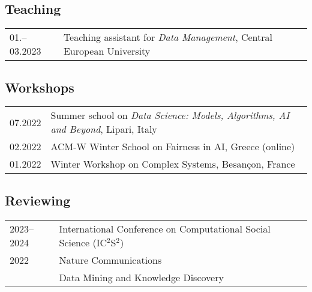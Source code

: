 \subsection*{Teaching}
\begin{longtable}[l]{@{}p{} p{}}
01.–03.2023 & Teaching assistant for \emph{Data Management}, Central European University\\
\end{longtable}


\subsection*{Workshops}
\begin{longtable}[l]{@{}p{} p{}}
    07.2022     & Summer school on \emph{Data Science: Models, Algorithms, AI and Beyond}, Lipari, Italy\\
    02.2022     & ACM-W Winter School on Fairness in AI, Greece (online)\\
    01.2022	    & Winter Workshop on Complex Systems, Besançon, France\\
\end{longtable}

\subsection*{Reviewing}
%
\begin{longtable}[l]{@{}p{} p{}}
    2023--2024 & International Conference on Computational Social Science (IC$^2$S$^2$) \\
    2022 & Nature Communications\\
         & Data Mining and Knowledge Discovery\\
\end{longtable}


